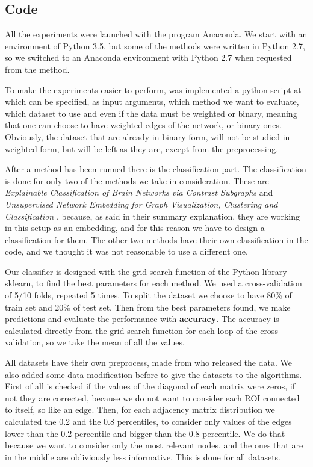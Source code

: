\subsection{Code}
All the experiments were launched with the program Anaconda. We start with an environment of Python 3.5, but some of the methods were written in Python 2.7, so we switched to an Anaconda environment with Python 2.7 when requested from the method.
\vspace{0.5cm}

To make the experiments easier to perform, was implemented a python script at which can be specified, as input arguments, which method we want to evaluate, which dataset to use and even if the data must be weighted or binary, meaning that one can choose to have weighted edges of the network, or binary ones. Obviously, the dataset that are already in binary form, will not be studied in weighted form, but will be left as they are, except from the preprocessing.
\vspace{0.5cm}

After a method has been runned there is the classification part. The classification is done for only two of the methods we take in consideration. These are \textit{Explainable Classification of Brain Networks via Contrast Subgraphs} \cite{lanciano2020cs} and \textit{Unsupervised Network Embedding for Graph Visualization, Clustering and Classification} \cite{GutierrezUn}, because, as said in their summary explanation, they are working in this setup as an embedding, and for this reason we have to design a classification for them. The other two methods have their own classification in the code, and we thought it was not reasonable to use a different one.
\vspace{0.5cm}


Our classifier is designed with the grid search function of the Python library sklearn, to find the best parameters for each method. We used a cross-validation of 5/10 folds, repeated 5 times. To split the dataset we choose to have 80\% of train set and 20\% of test set. Then from the best parameters found, we make predictions and evaluate the performance with \textbf{accuracy}. The accuracy is calculated directly from the grid search function for each loop of the cross-validation, so we take the mean of all the values. 
\vspace{0.5cm}

All datasets have their own preprocess, made from who released the data. We also added some data modification before to give the datasets to the algorithms. First of all is checked if the values of the diagonal of each matrix were zeros, if not they are corrected, because we do not want to consider each ROI connected to itself, so like an edge. Then, for each adjacency matrix distribution we calculated the 0.2 and the 0.8 percentiles, to consider only values of the edges lower than the 0.2 percentile and bigger than the 0.8 percentile. We do that because we want to consider only the most relevant nodes, and the ones that are in the middle are obliviously less informative. This is done for all datasets. 
\vspace{0.5cm}

